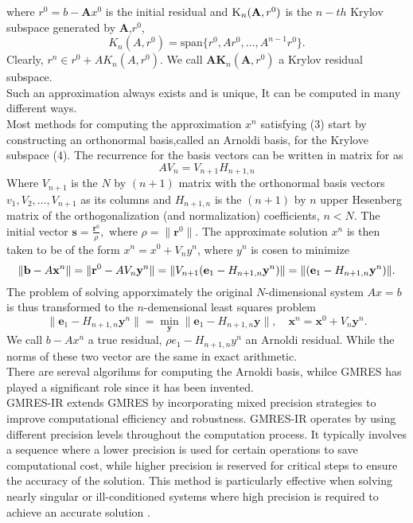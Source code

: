 where $r^0=b-\textbf{A}x^0$ is the initial residual and $\textsc{K}_n(\textbf{A},r^0)$ is the $n-th$ Krylov subspace generated by \textbf{A},$r^0$,
\begin{equation}
    K_n(A, r^0) = \text{span}\{r^0, Ar^0, \dots, A^{n-1}r^0\}.
\end{equation}
Clearly, $r^n \in r^0 + A K_n(A, r^0)$. We call $\textbf{AK}_{n}(\textbf{A},r^0)$ a Krylov residual subspace. \\
Such an approximation always exists and is unique, It can be computed in many different ways. \\
Most methods for computing the approximation $x^n$ satisfying (3) start by constructing an orthonormal basis,called an Arnoldi basis, for the Krylove subspace  (4). The recurrence for the basis vectors can be written in matrix for as 
\begin{equation}
    AV_n=V_{n+1}H_{n+1,n}
\end{equation}
Where $V_{n+1}$ is the $N$ by $(n+1)$ matrix with the orthonormal basis vectors $v_1,V_2,\dots,V_{n+1}$ as its columns and $H_{n+1,n}$ is the $(n+1)$ by $n$ upper Hesenberg matrix of the orthogonalization (and normalization) coefficients, $n<N$. The initial vector $\mathbf{s} = \frac{\mathbf{r}^0}{\rho}, \text{ where } \rho = \|\mathbf{r}^0\|.$ The approximate solution $x^n$ is then taken to be of the form $x^n=x^0+V_ny^n$, where $y^n$ is cosen to minimize
\begin{equation}
    \| \mathbf{b} - A\mathbf{x}^n \| = \| \mathbf{r}^0 - AV_n\mathbf{y}^n \| \\
= \| V_{n+1}(\mathbf{e}_1 - H_{n+1,n}\mathbf{y}^n) \| \\
= \| (\mathbf{e}_1 - H_{n+1,n}\mathbf{y}^n) \|.
\end{equation}
The problem of solving apporximately the original $N$-dimensional system $Ax=b$ is thus transformed to the $n$-demensional least squares problem
\begin{equation}
    \| \mathbf{e}_1 - H_{n+1,n}\mathbf{y}^n \| = \min_{\mathbf{y}} \| \mathbf{e}_1 - H_{n+1,n}\mathbf{y} \|, \quad \mathbf{x}^n = \mathbf{x}^0 + V_n\mathbf{y}^n.
\end{equation}
We call $b-Ax^n$ a true residual, $\rho e_1 - H_{n+1,n}y^n$ an Arnoldi residual. While the norms of these two vector are the same in exact arithmetic.\\
There are sereval algorihms for computing the Arnoldi basis, whilce GMRES has played a significant role since it has been invented.\\
GMRES-IR extends GMRES by incorporating mixed precision strategies to improve computational efficiency and robustness. GMRES-IR operates by using different precision levels throughout the computation process. It typically involves a sequence where a lower precision is used for certain operations to save computational cost, while higher precision is reserved for critical steps to ensure the accuracy of the solution. This method is particularly effective when solving nearly singular or ill-conditioned systems where high precision is required to achieve an accurate solution .\\
